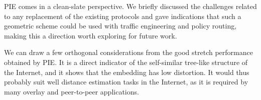 \documentclass[conference]{IEEEtran}
\begin{document}
PIE comes in a clean-slate perspective. We briefly discussed the challenges related to any replacement of the existing protocols and gave indications that such a geometric scheme could be used with traffic engineering and policy routing, making this a direction worth exploring for future work.


We can draw a few orthogonal considerations from the good stretch performance obtained by PIE. It is 
a direct indicator of the self-similar tree-like structure of the Internet,
and it shows that the embedding has low distortion. It would thus probably suit well distance estimation tasks in the Internet, 
as it is required by many overlay and peer-to-peer applications.




\end{document}
